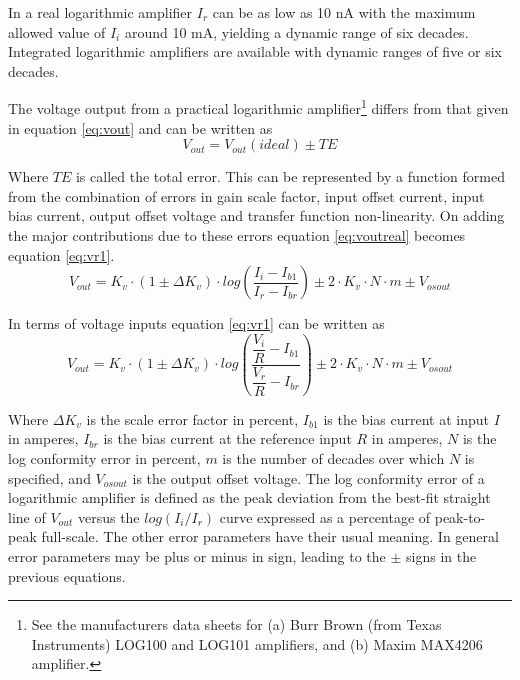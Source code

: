 In a real logarithmic amplifier $I_{r}$ can be as low as 10 nA with
the maximum allowed value of $I_{i}$ around 10 mA, yielding a dynamic
range of six decades.  Integrated logarithmic amplifiers are available
with dynamic ranges of five or six decades.


The voltage output from a practical logarithmic amplifier\footnote{See
the manufacturers data sheets for (a) Burr Brown (from Texas
Instruments) LOG100 and LOG101 amplifiers, and (b) Maxim MAX4206
amplifier.} differs from that given in equation \eqref{eq:vout} and
can be written as
\begin{equation}
\label{eq:voutreal}
V_{out}=V_{out}(ideal) \pm TE
\end{equation}

Where $TE$ is called the total error. This can be represented by a
function formed from the combination of errors in gain scale factor,
input offset current, input bias current, output offset voltage and
transfer function non-linearity.  On adding the major contributions
due to these errors equation \eqref{eq:voutreal} becomes
equation \eqref{eq:vr1}.
\begin{equation}
\label{eq:vr1}
V_{out}=K_{v}\cdot\left(1 \pm  \Delta K_{v}\right)\cdot log\left( \dfrac{I_{i}-I_{b1}}{I_{r}-I_{br}}\right) \pm 2\cdot K_{v}\cdot N\cdot m \pm V_{osout}
\end{equation}

In terms of voltage inputs equation \eqref{eq:vr1} can be written as
\begin{equation}
\label{eq:vr2}
V_{out}=K_{v}\cdot \left(1 \pm  \Delta K_{v}\right)\cdot log\left( \dfrac{\dfrac{V_{i}}{R}-I_{b1}}{\dfrac{V_{r}}{R}-I_{br}}\right) \pm 2\cdot  K_{v}\cdot N\cdot m \pm V_{osout}
\end{equation}

Where $\Delta K_v$ is the scale error factor in percent, $I_{b1}$ is
the bias current at input $I$ in amperes, $I_{br}$ is the bias current
at the reference input $R$ in amperes, $N$ is the log conformity error
in percent, $m$ is the number of decades over which $N$ is specified,
and $V_{osout}$ is the output offset voltage. The log conformity error
of a logarithmic amplifier is defined as the peak deviation from the
best-fit straight line of $V_{out}$ versus the $log(I_{i}/I_{r})$
curve expressed as a percentage of peak-to-peak full-scale. The other
error parameters have their usual meaning. In general error parameters
may be plus or minus in sign, leading to the $\pm$ signs in the
previous equations.

